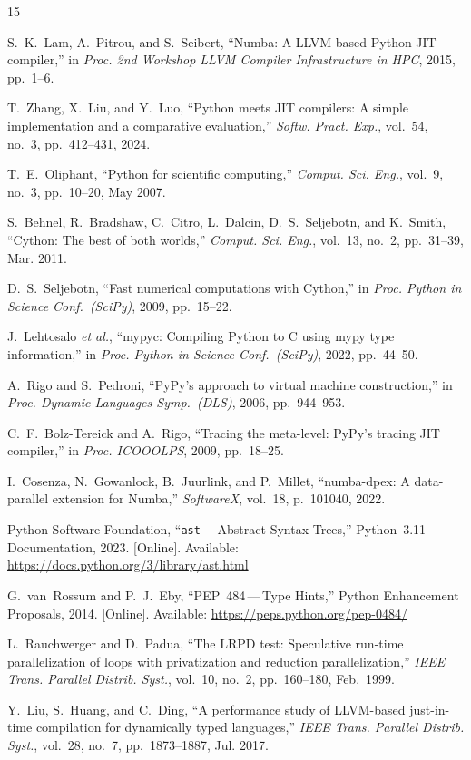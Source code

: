 \documentclass[journal]{IEEEtran}
\begin{document}
\begin{thebibliography}{15}

S.~K.~Lam, A.~Pitrou, and S.~Seibert,
``Numba: A LLVM-based Python JIT compiler,''
in \textit{Proc. 2nd Workshop LLVM Compiler Infrastructure in HPC},
2015, pp.~1--6.

T.~Zhang, X.~Liu, and Y.~Luo,
``Python meets JIT compilers: A simple implementation and a comparative
evaluation,''
\textit{Softw. Pract. Exp.},
vol.~54, no.~3, pp.~412--431, 2024.

T.~E.~Oliphant,
``Python for scientific computing,''
\textit{Comput. Sci. Eng.},
vol.~9, no.~3, pp.~10--20, May 2007.

S.~Behnel, R.~Bradshaw, C.~Citro, L.~Dalcin, D.~S.~Seljebotn, and K.~Smith,
``Cython: The best of both worlds,''
\textit{Comput. Sci. Eng.},
vol.~13, no.~2, pp.~31--39, Mar. 2011.

D.~S.~Seljebotn,
``Fast numerical computations with Cython,''
in \textit{Proc. Python in Science Conf.\ (SciPy)},
2009, pp.~15--22.

J.~Lehtosalo \textit{et al.},
``mypyc: Compiling Python to C using mypy type information,''
in \textit{Proc. Python in Science Conf.\ (SciPy)},
2022, pp.~44--50.

A.~Rigo and S.~Pedroni,
``PyPy's approach to virtual machine construction,''
in \textit{Proc. Dynamic Languages Symp.\ (DLS)},
2006, pp.~944--953.

C.~F.~Bolz-Tereick and A.~Rigo,
``Tracing the meta-level: PyPy's tracing JIT compiler,''
in \textit{Proc. ICOOOLPS},
2009, pp.~18--25.

I.~Cosenza, N.~Gowanlock, B.~Juurlink, and P.~Millet,
``numba-dpex: A data-parallel extension for Numba,''
\textit{SoftwareX},
vol.~18, p.~101040, 2022.

Python Software Foundation,
``\texttt{ast}\,---\,Abstract Syntax Trees,''
Python~3.11 Documentation, 2023.
[Online]. Available: \url{https://docs.python.org/3/library/ast.html}

G.~van~Rossum and P.~J.~Eby,
``PEP~484\,---\,Type Hints,''
Python Enhancement Proposals, 2014.
[Online]. Available: \url{https://peps.python.org/pep-0484/}

L.~Rauchwerger and D.~Padua,
``The LRPD test: Speculative run-time parallelization of loops with
privatization and reduction parallelization,''
\textit{IEEE Trans. Parallel Distrib. Syst.},
vol.~10, no.~2, pp.~160--180, Feb.~1999.

Y.~Liu, S.~Huang, and C.~Ding,
``A performance study of LLVM-based just-in-time compilation for dynamically
typed languages,''
\textit{IEEE Trans. Parallel Distrib. Syst.},
vol.~28, no.~7, pp.~1873--1887, Jul. 2017.

\end{thebibliography}
\end{document}
